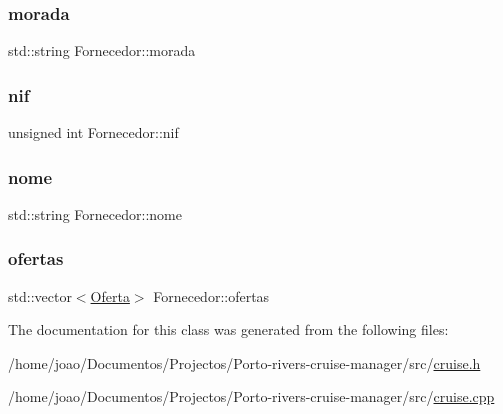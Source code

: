 \subsubsection{\texorpdfstring{morada}{morada}}
{\footnotesize\ttfamily std\+::string Fornecedor\+::morada\hspace{0.3cm}{\ttfamily [private]}}

\mbox{\label{classFornecedor_aa140a16d2ad85470dee138da971d647b}} 
\subsubsection{\texorpdfstring{nif}{nif}}
{\footnotesize\ttfamily unsigned int Fornecedor\+::nif\hspace{0.3cm}{\ttfamily [private]}}

\mbox{\label{classFornecedor_a5cfef99f616773a241417c6f6f10f016}} 
\subsubsection{\texorpdfstring{nome}{nome}}
{\footnotesize\ttfamily std\+::string Fornecedor\+::nome\hspace{0.3cm}{\ttfamily [private]}}

\mbox{\label{classFornecedor_ad4e0550855bb48c1e25f30ee66716999}} 
\subsubsection{\texorpdfstring{ofertas}{ofertas}}
{\footnotesize\ttfamily std\+::vector$<$\hyperlink{classOferta}{Oferta}$>$ Fornecedor\+::ofertas\hspace{0.3cm}{\ttfamily [private]}}



The documentation for this class was generated from the following files\+:\begin{DoxyCompactItemize}
\item 
/home/joao/\+Documentos/\+Projectos/\+Porto-\/rivers-\/cruise-\/manager/src/\hyperlink{cruise_8h}{cruise.\+h}\item 
/home/joao/\+Documentos/\+Projectos/\+Porto-\/rivers-\/cruise-\/manager/src/\hyperlink{cruise_8cpp}{cruise.\+cpp}\end{DoxyCompactItemize}

